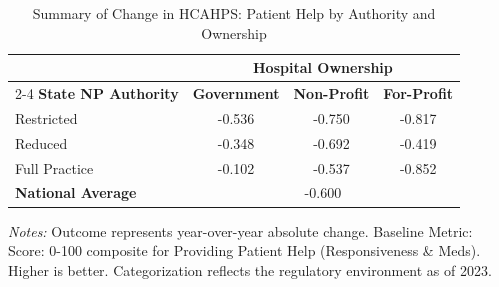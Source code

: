 \begin{table}[htbp]
    \centering
    \caption{Summary of Change in HCAHPS: Patient Help by Authority and Ownership}
    \label{tab:d_hcahps_grp2_own}
    \vspace{0.2cm}
    \begin{tabular}{lccc}
        \toprule
        & \multicolumn{3}{c}{\textbf{Hospital Ownership}} \\
        \cmidrule(lr){2-4}
        \textbf{State NP Authority} & \textbf{Government} & \textbf{Non-Profit} & \textbf{For-Profit} \\
        \midrule
        Restricted & -0.536 & -0.750 & -0.817 \\
        Reduced & -0.348 & -0.692 & -0.419 \\
        Full Practice & -0.102 & -0.537 & -0.852 \\
        \midrule
        \textbf{National Average} & \multicolumn{3}{c}{-0.600} \\
        \bottomrule
    \end{tabular}
    \vspace{0.1cm}
    \begin{minipage}{0.85\textwidth}
        \footnotesize \textit{Notes:} Outcome represents year-over-year absolute change. Baseline Metric: Score: 0-100 composite for Providing Patient Help (Responsiveness \& Meds). Higher is better. Categorization reflects the regulatory environment as of 2023.
    \end{minipage}
\end{table}